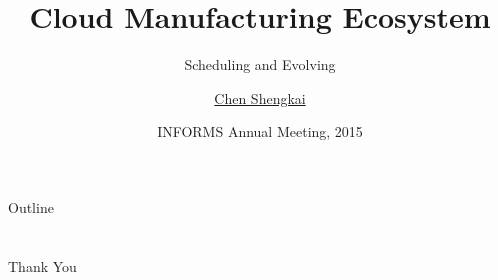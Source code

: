 \documentclass[x11names]{beamer}
\title{Cloud Manufacturing Ecosystem}
\subtitle{Scheduling and Evolving}
\author{\href{mailto:42@zju.edu.cn}{Chen Shengkai }} %
\institute[Zhejiang University] %
{
  Institute for Manufacturing Engineering and Automation\\
  Zhejiang University%
}
\date{INFORMS Annual Meeting, 2015}
\begin{document}
\begin{frame}
  \titlepage
\end{frame}

\begin{frame}{Outline}
  \begin{multicols}{2}
  \tableofcontents
  \end{multicols}
\end{frame}





\section*{}
\begin{frame}
\centering
\Large
Thank You
\end{frame}
%

\end{document}
